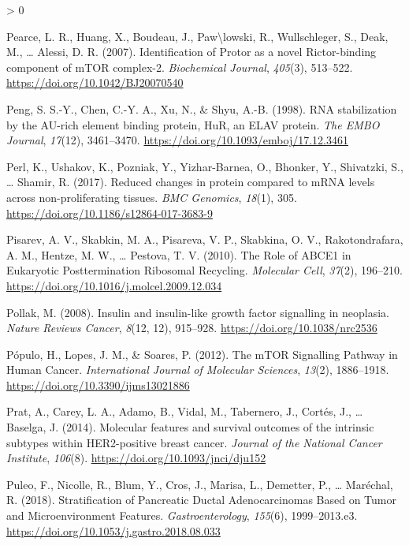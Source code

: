 \documentclass[
  12pt,
  openany]{book}
\newlength{\cslhangindent}
\newenvironment{CSLReferences}[2] %
 {%
  \setlength{\parindent}{0pt}
  \ifodd #1 \everypar{\setlength{\hangindent}{\cslhangindent}}\ignorespaces\fi
  \ifnum #2 > 0
  \setlength{\parskip}{#2\baselineskip}
  \fi
 }%
 {}
\begin{document}
\begin{CSLReferences}{1}{0}
\leavevmode\hypertarget{ref-Pearce2007}{}%
Pearce, L. R., Huang, X., Boudeau, J., Paw\textbackslash lowski, R., Wullschleger, S., Deak, M., \ldots{} Alessi, D. R. (2007). Identification of {Protor} as a novel {Rictor}-binding component of {mTOR} complex-2. \emph{Biochemical Journal}, \emph{405}(3), 513--522. \url{https://doi.org/10.1042/BJ20070540}

\leavevmode\hypertarget{ref-Peng1998}{}%
Peng, S. S.-Y., Chen, C.-Y. A., Xu, N., \& Shyu, A.-B. (1998). {RNA} stabilization by the {AU}-rich element binding protein, {HuR}, an {ELAV} protein. \emph{The EMBO Journal}, \emph{17}(12), 3461--3470. \url{https://doi.org/10.1093/emboj/17.12.3461}

\leavevmode\hypertarget{ref-Perl2017}{}%
Perl, K., Ushakov, K., Pozniak, Y., Yizhar-Barnea, O., Bhonker, Y., Shivatzki, S., \ldots{} Shamir, R. (2017). Reduced changes in protein compared to {mRNA} levels across non-proliferating tissues. \emph{BMC Genomics}, \emph{18}(1), 305. \url{https://doi.org/10.1186/s12864-017-3683-9}

\leavevmode\hypertarget{ref-Pisarev2010}{}%
Pisarev, A. V., Skabkin, M. A., Pisareva, V. P., Skabkina, O. V., Rakotondrafara, A. M., Hentze, M. W., \ldots{} Pestova, T. V. (2010). The {Role} of {ABCE1} in {Eukaryotic Posttermination Ribosomal Recycling}. \emph{Molecular Cell}, \emph{37}(2), 196--210. \url{https://doi.org/10.1016/j.molcel.2009.12.034}

\leavevmode\hypertarget{ref-Pollak2008}{}%
Pollak, M. (2008). Insulin and insulin-like growth factor signalling in neoplasia. \emph{Nature Reviews Cancer}, \emph{8}(12, 12), 915--928. \url{https://doi.org/10.1038/nrc2536}

\leavevmode\hypertarget{ref-Populo2012}{}%
Pópulo, H., Lopes, J. M., \& Soares, P. (2012). The {mTOR Signalling Pathway} in {Human Cancer}. \emph{International Journal of Molecular Sciences}, \emph{13}(2), 1886--1918. \url{https://doi.org/10.3390/ijms13021886}

\leavevmode\hypertarget{ref-Prat2014}{}%
Prat, A., Carey, L. A., Adamo, B., Vidal, M., Tabernero, J., Cortés, J., \ldots{} Baselga, J. (2014). Molecular features and survival outcomes of the intrinsic subtypes within {HER2}-positive breast cancer. \emph{Journal of the National Cancer Institute}, \emph{106}(8). \url{https://doi.org/10.1093/jnci/dju152}

\leavevmode\hypertarget{ref-Puleo2018}{}%
Puleo, F., Nicolle, R., Blum, Y., Cros, J., Marisa, L., Demetter, P., \ldots{} Maréchal, R. (2018). Stratification of {Pancreatic Ductal Adenocarcinomas Based} on {Tumor} and {Microenvironment Features}. \emph{Gastroenterology}, \emph{155}(6), 1999--2013.e3. \url{https://doi.org/10.1053/j.gastro.2018.08.033}


\end{CSLReferences}
\end{document}
